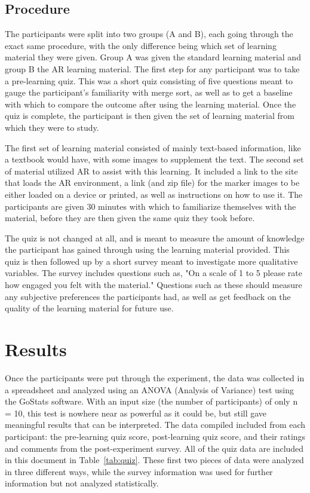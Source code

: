 \documentclass[sigconf]{acmart}
\begin{document}
\subsection{Procedure}
The participants were split into two groups (A and B), each going through the exact same procedure, with the only difference being which set of learning material they were given. Group A was given the standard learning material and group B the AR learning material. The first step for any participant was to take a pre-learning quiz. This was a short quiz consisting of five questions meant to gauge the participant's familiarity with merge sort, as well as to get a baseline with which to compare the outcome after using the learning material. Once the quiz is complete, the participant is then given the set of learning material from which they were to study.

The first set of learning material consisted of mainly text-based information, like a textbook would have, with some images to supplement the text. The second set of material utilized AR to assist with this learning. It included a link to the site that loads the AR environment, a link (and zip file) for the marker images to be either loaded on a device or printed, as well as instructions on how to use it. The participants are given 30 minutes with which to familiarize themselves with the material, before they are then given the same quiz they took before.

The quiz is not changed at all, and is meant to measure the amount of knowledge the participant has gained through using the learning material provided. This quiz is then followed up by a short survey meant to investigate more qualitative variables. The survey includes questions such as, "On a scale of 1 to 5 please rate how engaged you felt with the material." Questions such as these should measure any subjective preferences the participants had, as well as get feedback on the quality of the learning material for future use.

\section{Results}
Once the participants were put through the experiment, the data was collected in a spreadsheet and analyzed using an ANOVA (Analysis of Variance) test using the GoStats software. With an input size (the number of participants) of only n = 10, this test is nowhere near as powerful as it could be, but still gave meaningful results that can be interpreted. The data compiled included from each participant: the pre-learning quiz score, post-learning quiz score, and their ratings and comments from the post-experiment survey. All of the quiz data are included in this document in Table~\ref{tab:quiz}. These first two pieces of data were analyzed in three different ways, while the survey information was used for further information but not analyzed statistically.
\end{document}
